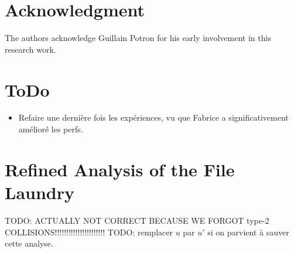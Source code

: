 \documentclass[11pt]{llncs}
\begin{document}

\section{Acknowledgment}

The authors acknowledge Guillain Potron for his early involvement in this research work.

\section{ToDo}

\begin{itemize}
\item Refaire une dernière fois les expériences, vu que Fabrice a significativement amélioré les perfs.
\end{itemize}

\nocite{rsync}
\nocite{wagner}



\appendix

\section{Refined Analysis of the File Laundry}
\label{app:refined-file-laundry}

TODO: ACTUALLY NOT CORRECT BECAUSE WE FORGOT type-2 COLLISIONS!!!!!!!!!!!!!!!!!!!!!!
TODO: remplacer $u$ par $u'$ si on parvient à sauver cette analyse.
\end{document}
